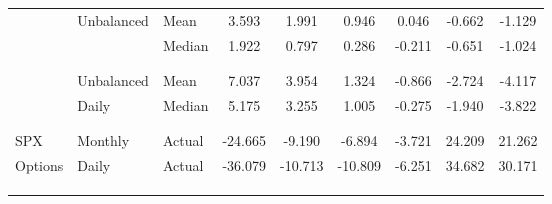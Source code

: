 \begin{tabular}{lllcccccc}
\cline{2-9} \\[-1.8ex] 
 & Unbalanced & Mean & 3.593 & 1.991 & 0.946 & 0.046 & -0.662 & -1.129 \\
 &  & Median & 1.922 & 0.797 & 0.286 & -0.211 & -0.651 & -1.024 \\ \\[-1.8ex]
\cline{2-9} \\[-1.8ex] 
 & Unbalanced & Mean & 7.037 & 3.954 & 1.324 & -0.866 & -2.724 & -4.117 \\
 & Daily & Median & 5.175 & 3.255 & 1.005 & -0.275 & -1.940 & -3.822 \\ \\[-1.8ex]
\hline \\[-1.8ex] 
SPX & Monthly & Actual & -24.665 & -9.190 & -6.894 & -3.721 & 24.209 & 21.262 \\
Options & Daily & Actual & -36.079 & -10.713 & -10.809 & -6.251 & 34.682 & 30.171 \\ \\[-1.8ex]
\hline \\[-1.8ex] 
\\[-0.8ex] 
\end{tabular} 
